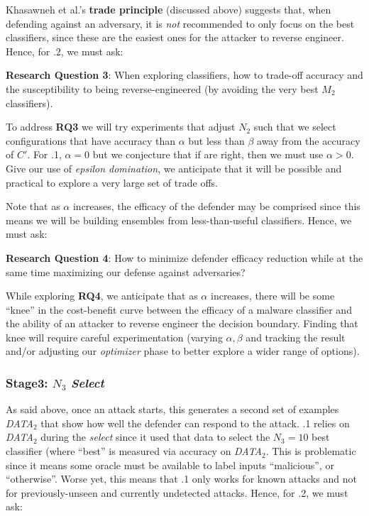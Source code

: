  

Khasawneh  et  al.'s  {\bf trade principle} (discussed above) suggests that,
when defending against an adversary, it is {\em not} recommended to only
focus on the best classifiers, since these are the easiest ones for
the attacker to reverse engineer. Hence, for {\IT}.2, we must ask: 
 
\begin{blockquote}
\noindent
\textbf{Research Question 3}: 
When exploring classifiers, how to trade-off accuracy
and the susceptibility  to  being  reverse-engineered (by avoiding the very best $M_2$ classifiers). 
 \end{blockquote} 
 
To address {\bf RQ3} we will try experiments that adjust $N_2$
such that we select  configurations that have accuracy  than $\alpha$ but less than $\beta$ away from the accuracy
of $C'$. For {\IT}.1, $\alpha=0$ but we conjecture that if 
are right, then we must use
$\alpha>0$. 
Give our use of {\em epsilon domination},
we anticipate that it will be possible and
practical to explore a very large set of
trade offs.


Note that as $\alpha$ increases, the   efficacy
of the defender may be   comprised since this means 
we will be building ensembles from less-than-useful classifiers. Hence, we must ask:

\begin{blockquote}
\noindent
\textbf{Research Question 4}: 
How to minimize defender efficacy reduction while at the same time
maximizing our defense against adversaries?
 \end{blockquote} 
 
 While exploring {\bf RQ4},    we anticipate
 that as $\alpha$ increases, there will be some ``knee'' in the cost-benefit curve between  the efficacy
of a malware classifier and the ability of an attacker to reverse engineer the decision boundary. Finding that knee will require careful experimentation (varying $\alpha,\beta$ and tracking the result and/or adjusting our {\em optimizer} phase to better explore
a wider range of options).


\subsubsection{Stage3: $N_3$ {\em Select}}
 As said above,
once an attack starts, 
this generates a second set of examples
{\em DATA$_2$} that show how well the defender can respond to the attack.  
{\IT}.1 relies on {\em DATA$_2$}  during  the {\em select}
since it used that data to select the $N_3=10$ best
classifier (where ``best'' is measured via accuracy on {\em DATA$_2$}. 
 This is problematic since it means
some   oracle must be available to label inputs ``malicious'', or 
``otherwise''. Worse yet, this means that {\IT}.1 
  only
works for known attacks and not for previously-unseen and currently undetected attacks.
Hence, for {\IT}.2, we   must ask:
 
